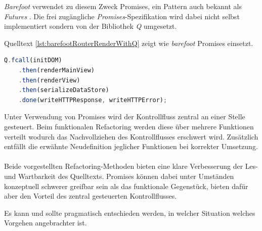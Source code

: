 \emph{Barefoot} verwendet zu diesem Zweck Promises, ein Pattern auch bekannt als \emph{Futures} \cite{FuturesAndPromises}. Die frei zugängliche \emph{Promises}-Spezifikation \cite{PromisesAPlusSpec} wird dabei nicht selbst implementiert sondern von der Bibliothek \emph{Q} \cite{QLibrary} umgesetzt.

Quelltext \ref{lst:barefootRouterRenderWithQ} zeigt wie \emph{barefoot} Promises einsetzt.

\begin{lstlisting}[language=JavaScript, firstnumber=215, caption={Ausschnitt aus server/router-mixin.js \cite{barefootRouterRenderWithQ}}, label={lst:barefootRouterRenderWithQ}]
	Q.fcall(initDOM)
	.then(renderMainView)
	.then(renderView)
	.then(serializeDataStore)
	.done(writeHTTPResponse, writeHTTPError);
\end{lstlisting}

Unter Verwendung von Promises wird der Kontrollfluss zentral an einer Stelle gesteuert. Beim funktionalen Refactoring werden diese über mehrere Funktionen verteilt wodurch das Nachvollziehen des Kontrollflusses erschwert wird. Zusätzlich entfällt die erwähnte Neudefinition jeglicher Funktionen bei korrekter Umsetzung.
\\ \\
Beide vorgestellten Refactoring-Methoden bieten eine klare Verbesserung der Les- und Wartbarkeit des Quelltexts. Promises können dabei unter Umständen konzeptuell schwerer greifbar sein als das funktionale Gegenstück, bieten dafür aber den Vorteil des zentral gesteuerten Kontrollflusses.

Es kann und sollte pragmatisch entschieden werden, in welcher Situation welches Vorgehen angebrachter ist.